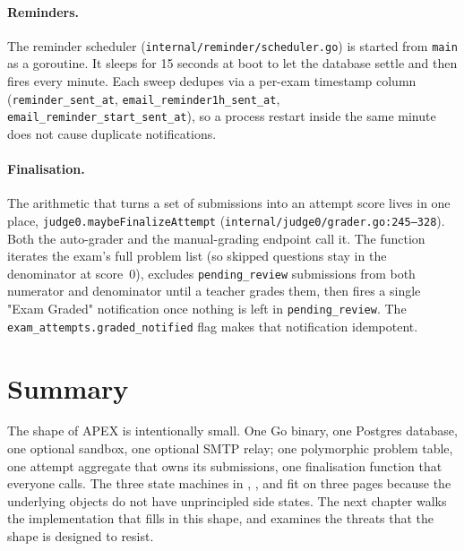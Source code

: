\paragraph{Reminders.} The reminder scheduler (\texttt{internal/reminder/scheduler.go}) is started from \texttt{main} as a goroutine. It sleeps for 15 seconds at boot to let the database settle and then fires every minute. Each sweep dedupes via a per-exam timestamp column (\texttt{reminder\_sent\_at}, \texttt{email\_reminder1h\_sent\_at}, \texttt{email\_reminder\_start\_sent\_at}), so a process restart inside the same minute does not cause duplicate notifications.

\paragraph{Finalisation.} The arithmetic that turns a set of submissions into an attempt score lives in one place, \texttt{judge0.maybeFinalizeAttempt} (\texttt{internal/judge0/grader.go:245--328}). Both the auto-grader and the manual-grading endpoint call it. The function iterates the exam's full problem list (so skipped questions stay in the denominator at score~0), excludes \texttt{pending\_review} submissions from both numerator and denominator until a teacher grades them, then fires a single "Exam Graded" notification once nothing is left in \texttt{pending\_review}. The \texttt{exam\_attempts.graded\_notified} flag makes that notification idempotent.

\section{Summary}

The shape of APEX is intentionally small. One Go binary, one Postgres database, one optional sandbox, one optional SMTP relay; one polymorphic problem table, one attempt aggregate that owns its submissions, one finalisation function that everyone calls. The three state machines in , , and  fit on three pages because the underlying objects do not have unprincipled side states. The next chapter walks the implementation that fills in this shape, and  examines the threats that the shape is designed to resist.
